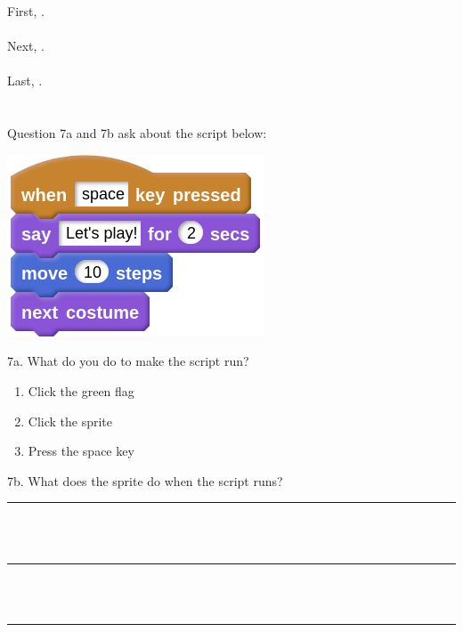 \documentclass[letterpaper,12pt]{article}
\begin{document}
\noindent First, \hrulefill . \\ \\
Next, \hrulefill . \\ \\
Last, \hrulefill . \\ \\

\noindent \dotfill \\
Question 7a and 7b ask about the script below:
\begin{center}
\includegraphics[scale=.7]{q7_script0.png}
\end{center}

\noindent 7a. What do you do to make the script run?
\renewcommand{\theenumi}{\Alph{enumi}}
\begin{enumerate}
\item Click the green flag
\item Click the sprite
\item Press the space key \\
\end{enumerate}

\noindent 7b. What does the sprite do when the script runs? \\

\noindent \rule{19cm}{0.4pt} \\ \\
\rule{19cm}{0.4pt} \\ \\
\rule{19cm}{0.4pt}
\end{document}
